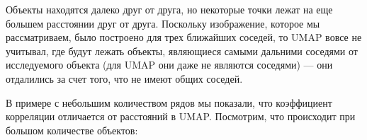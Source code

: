 \begin{multicols}{2}
	
	Объекты находятся далеко друг от друга, но некоторые точки лежат на еще большем расстоянии друг от друга. Поскольку изображение, которое мы рассматриваем, было построено для трех ближайших соседей, то UMAP вовсе не учитывал, где будут лежать объекты, являющиеся самыми дальними соседями от исследуемого объекта (для UMAP они даже не являются соседями) --- они отдалились за счет того, что не имеют общих соседей.
\end{multicols}
\newpage
В примере с небольшим количеством рядов мы показали, что коэффициент корреляции отличается от расстояний в UMAP. Посмотрим, что происходит при большом количестве объектов:

\begin{figure}[H]
	\noindent {}
\end{figure}

